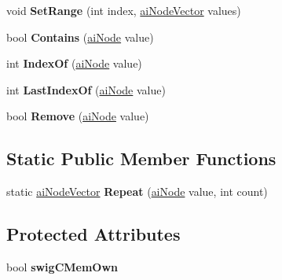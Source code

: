 \begin{DoxyCompactItemize}
\item 
\hypertarget{classai_node_vector_aee4f8c01e5f0a5585aa9d3a4e3331806}{void {\bfseries Set\+Range} (int index, \hyperlink{classai_node_vector}{ai\+Node\+Vector} values)}\label{classai_node_vector_aee4f8c01e5f0a5585aa9d3a4e3331806}

\item 
\hypertarget{classai_node_vector_acb31edfabd9f9e45a0444d7c22c0a0f8}{bool {\bfseries Contains} (\hyperlink{structai_node}{ai\+Node} value)}\label{classai_node_vector_acb31edfabd9f9e45a0444d7c22c0a0f8}

\item 
\hypertarget{classai_node_vector_abc524f208557b5843cf5cba0542ff6cd}{int {\bfseries Index\+Of} (\hyperlink{structai_node}{ai\+Node} value)}\label{classai_node_vector_abc524f208557b5843cf5cba0542ff6cd}

\item 
\hypertarget{classai_node_vector_a7c51af4e58373b09da69828f81f9050d}{int {\bfseries Last\+Index\+Of} (\hyperlink{structai_node}{ai\+Node} value)}\label{classai_node_vector_a7c51af4e58373b09da69828f81f9050d}

\item 
\hypertarget{classai_node_vector_a9c027b7b64cf8b9f096bb23ebebe2ddb}{bool {\bfseries Remove} (\hyperlink{structai_node}{ai\+Node} value)}\label{classai_node_vector_a9c027b7b64cf8b9f096bb23ebebe2ddb}

\end{DoxyCompactItemize}
\subsection*{Static Public Member Functions}
\begin{DoxyCompactItemize}
\item 
\hypertarget{classai_node_vector_a3d27a18fcc825319c0d3a4920d680fec}{static \hyperlink{classai_node_vector}{ai\+Node\+Vector} {\bfseries Repeat} (\hyperlink{structai_node}{ai\+Node} value, int count)}\label{classai_node_vector_a3d27a18fcc825319c0d3a4920d680fec}

\end{DoxyCompactItemize}
\subsection*{Protected Attributes}
\begin{DoxyCompactItemize}
\item 
\hypertarget{classai_node_vector_a57c60f3899b3de174000e5d1ae9a8d3b}{bool {\bfseries swig\+C\+Mem\+Own}}\label{classai_node_vector_a57c60f3899b3de174000e5d1ae9a8d3b}

\end{DoxyCompactItemize}
